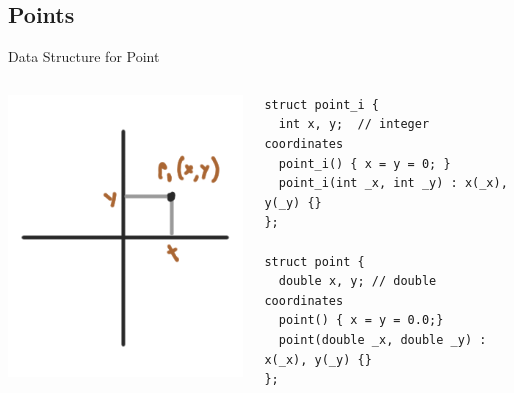\subsection{Points}
\begin{frame}[fragile]{Data Structure for Point}
  \begin{columns}
    \includegraphics[width=\textwidth]{../img/geom2}
    \begin{exampleblock}{}
\begin{verbatim}
struct point_i {
  int x, y;  // integer coordinates
  point_i() { x = y = 0; }
  point_i(int _x, int _y) : x(_x), y(_y) {}
};

struct point {
  double x, y; // double coordinates
  point() { x = y = 0.0;}
  point(double _x, double _y) : x(_x), y(_y) {}
};
\end{verbatim}
    \end{exampleblock}
  \end{columns}
\end{frame}


